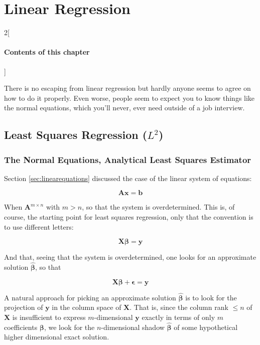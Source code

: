 \chapter{Linear Regression}
\label{chap:linearregression}

\begin{multicols}{2}[\subsubsection*{Contents of this chapter}]
\end{multicols}

There is no escaping from linear regression but hardly anyone seems to agree on how to do it properly. Even worse, people seem to expect you to know things like the normal equations, which you'll never, ever need outside of a job interview. 


\section{Least Squares Regression ($L^2$)}

\subsection{The Normal Equations, Analytical Least Squares Estimator}
Section \ref{sec:linearequations} discussed the case of the linear system of equations:

\begin{equation}
\mathbf{A}\mathbf{x} = \mathbf{b}
\end{equation}


When $\mathbf{A}^{m\times n}$ with $m>n$, so that the system is overdetermined. This is, of course, the starting point for least squares regression, only that the convention is to use different letters:

\begin{equation}
\mathbf{X}\mathbf{\beta} = \mathbf{y}
\end{equation}

And that, seeing that the system is overdetermined, one looks for an approximate solution $\mathbf{\hat{\beta}}$, so that 

\begin{equation}
\mathbf{X}\mathbf{\beta} + \mathbf{\epsilon} = \mathbf{y}
\end{equation}


A natural approach for picking an approximate solution $\mathbf{\hat{\beta}}$ is to look for the projection of $\mathbf{y}$ in the column space of $\mathbf{X}$. That is, since the column rank $\leq n$ of $\mathbf{X}$ is insufficient to express $m$-dimensional $\mathbf{y}$ exactly in terms of only $m$ coefficients $\mathbf{\beta}$, we look for the $n$-dimensional shadow $\mathbf{\hat{\beta}}$ of some hypothetical higher dimensional exact solution. 


